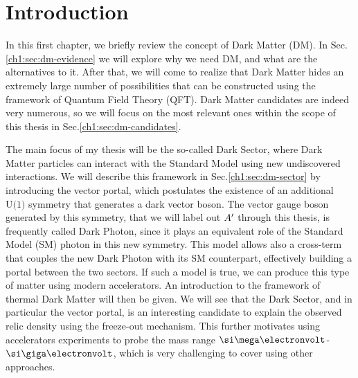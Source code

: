 
\newcommand{\pdirone}{chapters/plots/chapter1}

\chapter{Introduction}

\label{chapter1}

In this first chapter, we briefly review the concept of Dark Matter (DM). In Sec.\ref{ch1:sec:dm-evidence} we will explore why we need DM, and what are the alternatives to it. After that, we will come to realize that Dark Matter hides an extremely large number of possibilities that can be constructed using the framework of Quantum Field Theory (QFT). Dark Matter candidates are indeed very numerous, so we will focus on the most relevant ones within the scope of this thesis in Sec.\ref{ch1:sec:dm-candidates}.

The main focus of my thesis will be the so-called Dark Sector, where Dark Matter particles can interact with the Standard Model using new undiscovered interactions. We will describe this framework in Sec.\ref{ch1:sec:dm-sector}  by introducing the vector portal, which postulates the existence of an additional $\textrm{U(1)}$ symmetry that generates a dark vector boson. The vector gauge boson generated by this symmetry, that we will label out $A'$ through this thesis,  is frequently called Dark Photon, since it plays an equivalent role of the Standard Model (SM) photon in this new symmetry. This model allows also a cross-term that couples the new Dark Photon with its SM counterpart, effectively building a portal between the two sectors. If such a model is true, we can produce this type of matter using modern accelerators. An introduction to the framework of thermal Dark Matter will then be given. We will see that the Dark Sector, and in particular the vector portal, is an interesting candidate to explain the observed relic density using the freeze-out mechanism. This further motivates using accelerators experiments to probe the mass range $\mev$-$\gev$, which is very challenging to cover using other approaches.

